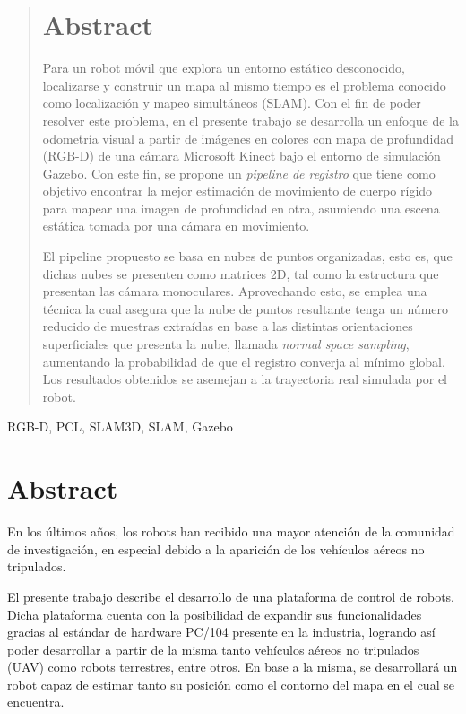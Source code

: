 \ifimagenes
\ifimagenespaper
\begin{abstract}
\else
\section*{Abstract}
\fi
Para un robot móvil que explora un entorno estático desconocido, localizarse y construir un mapa al mismo tiempo es el problema conocido como localización y mapeo simultáneos (SLAM). Con el fin de poder resolver este problema, en el presente trabajo se desarrolla un enfoque de la odometría visual a partir de imágenes en colores con mapa de profundidad (RGB-D) de una cámara Microsoft Kinect bajo el entorno de simulación Gazebo. Con este fin, se propone un \textit{pipeline de registro} que tiene como objetivo encontrar la mejor estimación de movimiento de cuerpo rígido para mapear una imagen de profundidad en otra, asumiendo una escena estática tomada por una cámara en movimiento. 

El pipeline propuesto se basa en nubes de puntos organizadas, esto es, que dichas nubes se presenten como matrices 2D, tal como la estructura que presentan las cámara monoculares. Aprovechando esto, se emplea una técnica la cual asegura que la nube de puntos resultante tenga un número reducido de muestras extraídas en base a las distintas orientaciones superficiales que presenta la nube, llamada \textit{normal space sampling}, aumentando la probabilidad de que el registro converja al mínimo global. Los resultados obtenidos se asemejan a la trayectoria real simulada por el robot.
\ifimagenespaper
\end{abstract}

\begin{IEEEkeywords}
RGB-D, PCL, SLAM3D, SLAM, Gazebo
\end{IEEEkeywords}
\else
\fi

\else
\section*{Abstract}
\label{sec:1_abstract}

En los últimos años, los robots han recibido una mayor atención de la comunidad de investigación, en especial debido a la aparición de los vehículos aéreos no tripulados.

El presente trabajo describe el desarrollo de una plataforma de control de robots. Dicha plataforma cuenta con la posibilidad de expandir sus funcionalidades gracias al estándar de hardware PC/104 presente en la industria, logrando así poder desarrollar a partir de la misma tanto vehículos aéreos no tripulados (UAV) como robots terrestres, entre otros. En base a la misma, se desarrollará un robot capaz de estimar tanto su posición como el contorno del mapa en el cual se encuentra.
\fi

